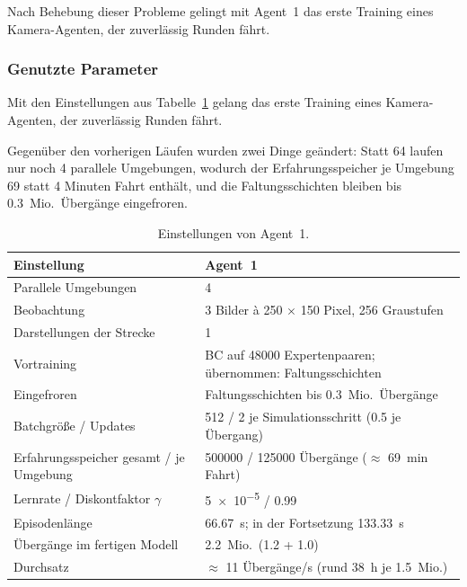 Nach Behebung dieser Probleme gelingt mit Agent~1 das erste Training eines Kamera-Agenten, der zuverlässig Runden fährt.

\subsubsection{Genutzte Parameter}
\label{subsec:agent1_einstellungen}

Mit den Einstellungen aus Tabelle~\ref{tab:agent1_einstellungen} gelang das erste Training eines Kamera-Agenten, der zuverlässig Runden fährt.

Gegenüber den vorherigen Läufen wurden zwei Dinge geändert: Statt 64 laufen nur noch 4 parallele Umgebungen, wodurch der Erfahrungsspeicher je Umgebung 69 statt 4 Minuten Fahrt enthält, und die Faltungsschichten bleiben bis \num{0.3}~Mio.\ Übergänge eingefroren.

\begin{table}[htbp]
  \centering
  \caption{Einstellungen von Agent~1.}
  \label{tab:agent1_einstellungen}
  \small
  \begin{tabularx}{\linewidth}{@{}l X@{}}
    \toprule
    \textbf{Einstellung} & \textbf{Agent~1} \\
    \midrule
    Parallele Umgebungen                    & 4 \\
    Beobachtung                             & 3 Bilder à \num{250} $\times$ \num{150} Pixel, 256 Graustufen \\
    Darstellungen der Strecke               & 1 \\
    Vortraining                             & \ac{BC} auf \num{48000} Expertenpaaren; übernommen: Faltungsschichten \\
    Eingefroren                             & Faltungsschichten bis \num{0.3}~Mio.\ Übergänge \\
    Batchgröße / Updates                    & 512 / 2 je Simulationsschritt (\num{0.5} je Übergang) \\
    Erfahrungsspeicher gesamt / je Umgebung & \num{500000} / \num{125000} Übergänge ($\approx$ \SI{69}{\minute} Fahrt) \\
    Lernrate / Diskontfaktor $\gamma$       & \num{5e-5} / \num{0.99} \\
    Episodenlänge                           & \SI{66.67}{\second}; in der Fortsetzung \SI{133.33}{\second} \\
    Übergänge im fertigen Modell            & \num{2.2}~Mio.\ (\num{1.2} + \num{1.0}) \\
    Durchsatz                               & $\approx$ 11 Übergänge/s (rund \SI{38}{\hour} je \num{1.5}~Mio.) \\
    \bottomrule
  \end{tabularx}
\end{table}

